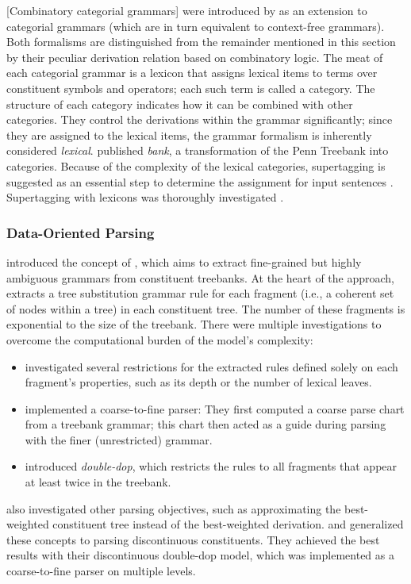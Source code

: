 \documentclass[../document.tex]{subfiles}
\begin{document}
    [Combinatory categorial grammars]  were introduced by \citet{Ste11} as an extension to categorial grammars (which are in turn equivalent to context-free grammars).
    Both formalisms are distinguished from the remainder mentioned in this section by their peculiar derivation relation based on combinatory logic.
    The meat of each categorial grammar is a lexicon that assigns lexical items to terms over constituent symbols and operators; each such term is called a category.
    The structure of each category indicates how it can be combined with other categories.
    They control the derivations within the grammar significantly; since they are assigned to the lexical items, the grammar formalism is inherently considered \emph{lexical}.
     published \emph{bank}, a transformation of the Penn Treebank into  categories.
    Because of the complexity of the lexical categories, supertagging is suggested as an essential step to determine the assignment for input sentences \citep{Clark04}.
    Supertagging with  lexicons was thoroughly investigated \citep{clark2002supertagging, LewisSteedman14, vaswani2016supertagging, Kad18, StaSte20}.

    \subsubsection*{Data-Oriented Parsing}
     introduced the concept of  , which aims to extract fine-grained but highly ambiguous grammars from constituent treebanks.
    At the heart of the approach, \citeauthor{Bod92} extracts a tree substitution grammar rule for each fragment (i.e.\@, a coherent set of nodes within a tree) in each constituent tree.
    The number of these fragments is exponential to the size of the treebank.
    There were multiple investigations to overcome the computational burden of the model's complexity:
    \begin{itemize}
        \item \citet{Bod01} investigated several restrictions for the extracted rules defined solely on each fragment's properties, such as its depth or the number of lexical leaves.
        \item \citet{Ban10} implemented a coarse-to-fine parser:
            They first computed a coarse parse chart from a treebank grammar; this chart then acted as a guide during parsing with the finer (unrestricted)  grammar.
        \item \citet{San11} introduced \emph{double-dop}, which restricts the rules to all fragments that appear at least twice in the treebank.
    \end{itemize}
     also investigated other parsing objectives, such as approximating the best-weighted constituent tree instead of the best-weighted derivation.
     and \cite{CraSchBod16} generalized these concepts to parsing discontinuous constituents.
    They achieved the best results with their discontinuous double-dop model, which was implemented as a coarse-to-fine parser on multiple levels.
\end{document}
